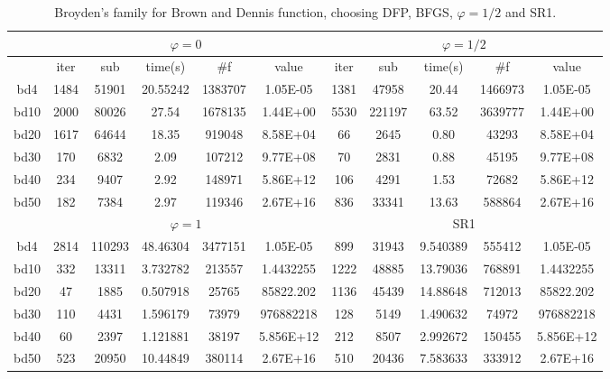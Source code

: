 \documentclass{article}
\begin{document}
\begin{table}[H]
	\centering
	\begin{tabular}{|c|c|c|c|c|c|c|c|c|c|c|}
		\hline
		& \multicolumn{5}{c|}{$\varphi = 0$}             & \multicolumn{5}{c|}{$\varphi = 1/2$}           \\ \hline
		& iter & sub    & time(s)  & \#f     & value     & iter & sub    & time(s)  & \#f     & value     \\ \hline
		bd4  & 1484 & 51901  & 20.55242 & 1383707 & 1.05E-05  & 1381 & 47958  & 20.44    & 1466973 & 1.05E-05  \\ \hline
		bd10 & 2000 & 80026  & 27.54    & 1678135 & 1.44E+00  & 5530 & 221197 & 63.52    & 3639777 & 1.44E+00  \\ \hline
		bd20 & 1617 & 64644  & 18.35    & 919048  & 8.58E+04  & 66   & 2645   & 0.80     & 43293   & 8.58E+04  \\ \hline
		bd30 & 170  & 6832   & 2.09     & 107212  & 9.77E+08  & 70   & 2831   & 0.88     & 45195   & 9.77E+08  \\ \hline
		bd40 & 234  & 9407   & 2.92     & 148971  & 5.86E+12  & 106  & 4291   & 1.53     & 72682   & 5.86E+12  \\ \hline
		bd50 & 182  & 7384   & 2.97     & 119346  & 2.67E+16  & 836  & 33341  & 13.63    & 588864  & 2.67E+16  \\ \hline
		& \multicolumn{5}{c|}{$\varphi = 1$}             & \multicolumn{5}{c|}{SR1}                       \\ \hline
		bd4  & 2814 & 110293 & 48.46304 & 3477151 & 1.05E-05  & 899  & 31943  & 9.540389 & 555412  & 1.05E-05  \\ \hline
		bd10 & 332  & 13311  & 3.732782 & 213557  & 1.4432255 & 1222 & 48885  & 13.79036 & 768891  & 1.4432255 \\ \hline
		bd20 & 47   & 1885   & 0.507918 & 25765   & 85822.202 & 1136 & 45439  & 14.88648 & 712013  & 85822.202 \\ \hline
		bd30 & 110  & 4431   & 1.596179 & 73979   & 976882218 & 128  & 5149   & 1.490632 & 74972   & 976882218 \\ \hline
		bd40 & 60   & 2397   & 1.121881 & 38197   & 5.856E+12 & 212  & 8507   & 2.992672 & 150455  & 5.856E+12 \\ \hline
		bd50 & 523  & 20950  & 10.44849 & 380114  & 2.67E+16  & 510  & 20436  & 7.583633 & 333912  & 2.67E+16  \\ \hline
	\end{tabular}
\caption{Broyden's family for Brown and Dennis function, choosing DFP, BFGS, $\varphi = 1/2$ and SR1.}
\end{table}
\end{document}
